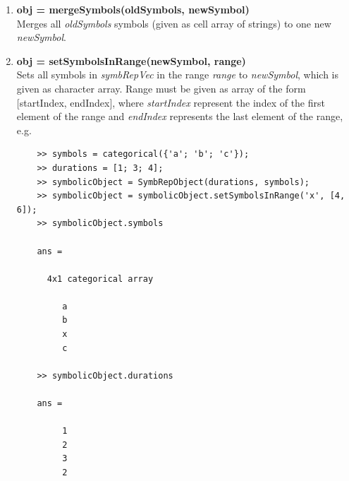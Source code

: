 \documentclass[a4]{scrreprt}
\begin{document}
\begin{enumerate}
	\item \textbf{obj = mergeSymbols(oldSymbols, newSymbol)}\\
	Merges all \textit{oldSymbols} symbols (given as cell array of strings) to one new \textit{newSymbol}.
	
	\item \textbf{obj = setSymbolsInRange(newSymbol, range)}\\
	Sets all symbols in \textit{symbRepVec} in the range \textit{range} to \textit{newSymbol}, which is given as character array. Range must be given as array of the form [startIndex, endIndex], where \textit{startIndex} represent the index of the first element of the range and \textit{endIndex} represents the last element of the range, e.g.
	\begin{verbatim}
	>> symbols = categorical({'a'; 'b'; 'c'});
	>> durations = [1; 3; 4];
	>> symbolicObject = SymbRepObject(durations, symbols);
	>> symbolicObject = symbolicObject.setSymbolsInRange('x', [4, 6]);
	>> symbolicObject.symbols
	
	ans = 
	
	  4x1 categorical array
	
	     a 
	     b 
	     x 
	     c 
	
	>> symbolicObject.durations
	
	ans =
	
	     1
	     2
	     3
	     2	
	\end{verbatim}
	

\end{enumerate}
\end{document}
